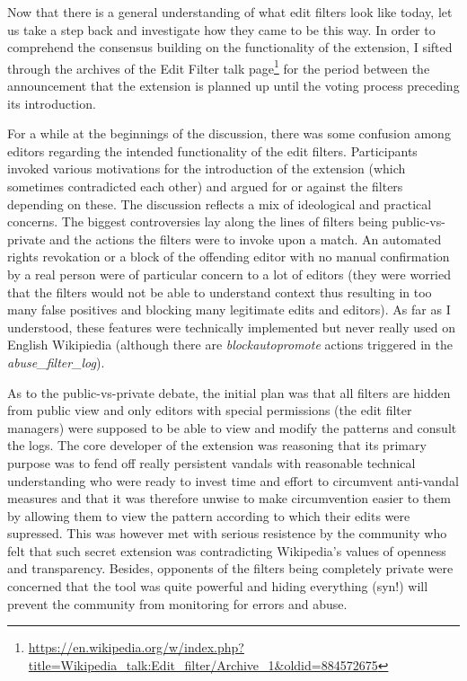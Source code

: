Now that there is a general understanding of what edit filters look like today, let us take a step back and investigate how they came to be this way.
In order to comprehend the consensus building on the functionality of the extension, I sifted through the archives of the Edit Filter talk page\footnote{\url{https://en.wikipedia.org/w/index.php?title=Wikipedia_talk:Edit_filter/Archive_1&oldid=884572675}}
for the period between the announcement that the extension is planned up until the voting process preceding its introduction.

For a while at the beginnings of the discussion, there was some confusion among editors regarding the intended functionality of the edit filters.
Participants invoked various motivations for the introduction of the extension (which sometimes contradicted each other) and argued for or against the filters depending on these.
The discussion reflects a mix of ideological and practical concerns.
The biggest controversies lay along the lines of filters being public-vs-private and the actions the filters were to invoke upon a match.
An automated rights revokation or a block of the offending editor with no manual confirmation by a real person were of particular concern to a lot of editors (they were worried that the filters would not be able to understand context thus resulting in too many false positives and blocking many legitimate edits and editors).
As far as I understood, these features were technically implemented but never really used on English Wikipiedia (although there are \emph{blockautopromote} actions triggered in the \emph{abuse\_filter\_log}). %

As to the public-vs-private debate, the initial plan was that all filters are hidden from public view and only editors with special permissions (the edit filter managers) were supposed to be able to view and modify the patterns and consult the logs.
The core developer of the extension was reasoning that its primary purpose was to fend off really persistent vandals with reasonable technical understanding who were ready to invest time and effort to circumvent anti-vandal measures
and that it was therefore unwise to make circumvention easier to them by allowing them to view the pattern according to which their edits were supressed.
This was however met with serious resistence by the community who felt that such secret extension was contradicting Wikipedia's values of openness and transparency.
Besides, opponents of the filters being completely private were concerned that the tool was quite powerful and hiding everything (syn!) will prevent the community from monitoring for errors and abuse.

